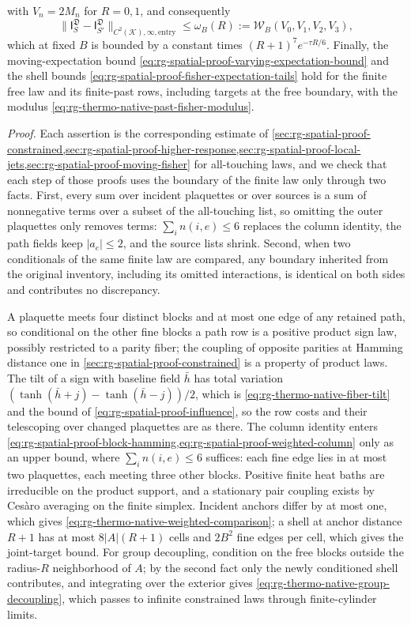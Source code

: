 with $V_n=2M_n$ for $R=0,1$, and consequently
\begin{equation}
 \|\mathsf I^{\mathfrak D}_S-\mathsf I^{\mathfrak D}_{S'}\|_{C^2(\mathcal K),\infty,\mathrm{entry}}
 \le\omega_B(R):=\mathcal W_B(V_0,V_1,V_2,V_3),
 \label{eq:rg-thermo-native-past-fisher-modulus}
\end{equation}
which at fixed $B$ is bounded by a constant times $(R+1)^7e^{-\tau R/6}$.
Finally, the moving-expectation bound
\cref{eq:rg-spatial-proof-varying-expectation-bound} and the shell bounds
\cref{eq:rg-spatial-proof-fisher-expectation-tails} hold for the finite free
law and its finite-past rows, including targets at the free boundary, with
the modulus \cref{eq:rg-thermo-native-past-fisher-modulus}.

\noindent\emph{Proof.}
Each assertion is the corresponding estimate of
\cref{sec:rg-spatial-proof-constrained,sec:rg-spatial-proof-higher-response,sec:rg-spatial-proof-local-jets,sec:rg-spatial-proof-moving-fisher}
for all-touching laws, and we check that each step of those proofs uses the
boundary of the finite law only through two facts. First, every sum over
incident plaquettes or over sources is a sum of nonnegative terms over a
subset of the all-touching list, so omitting the outer plaquettes only
removes terms: $\sum_in(i,e)\le6$ replaces the column identity, the path
fields keep $|a_e|\le2$, and the source lists shrink. Second, when two
conditionals of the same finite law are compared, any boundary inherited
from the original inventory, including its omitted interactions, is
identical on both sides and contributes no discrepancy.

A plaquette meets four distinct blocks and at most one edge of any retained
path, so conditional on the other fine blocks a path row is a positive
product sign law, possibly restricted to a parity fiber; the coupling of
opposite parities at Hamming distance one in
\cref{sec:rg-spatial-proof-constrained} is a property of product laws. The
tilt of a sign with baseline field $\bar h$ has total variation
$(\tanh(\bar h+j)-\tanh(\bar h-j))/2$, which is
\cref{eq:rg-thermo-native-fiber-tilt} and the bound of
\cref{eq:rg-spatial-proof-influence}, so the row costs and their telescoping
over changed plaquettes are as there. The column identity enters
\cref{eq:rg-spatial-proof-block-hamming,eq:rg-spatial-proof-weighted-column}
only as an upper bound, where $\sum_in(i,e)\le6$ suffices: each fine edge
lies in at most two plaquettes, each meeting three other blocks. Positive
finite heat baths are irreducible on the product support, and a stationary
pair coupling exists by Ces\`aro averaging on the finite simplex. Incident
anchors differ by at most one, which gives
\cref{eq:rg-thermo-native-weighted-comparison}; a shell at anchor distance
$R+1$ has at most $8|A|(R+1)$ cells and $2B^2$ fine edges per cell, which
gives the joint-target bound. For group decoupling, condition on the free
blocks outside the radius-$R$ neighborhood of $A$; by the second fact only the
newly conditioned shell contributes, and integrating over the exterior gives
\cref{eq:rg-thermo-native-group-decoupling}, which passes to infinite
constrained laws through finite-cylinder limits.

